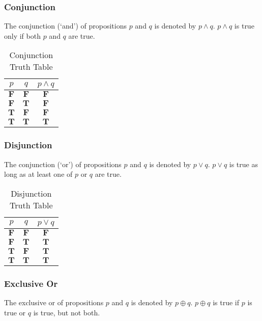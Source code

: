 \subsubsection{Conjunction}
The conjunction (`and') of propositions \(p\) and \(q\) is denoted by \(p \land q\). \(p \land q\) is true only if both \(p\) and \(q\) are true.

\begin{table}[htbp]
    \centering
    \begin{tabular}{ccc}
        \toprule
        \(p\)          & \(q\)          & \(p \land q\)  \\
        \midrule
        \(\mathbf{F}\) & \(\mathbf{F}\) & \(\mathbf{F}\) \\
        \(\mathbf{F}\) & \(\mathbf{T}\) & \(\mathbf{F}\) \\
        \(\mathbf{T}\) & \(\mathbf{F}\) & \(\mathbf{F}\) \\
        \(\mathbf{T}\) & \(\mathbf{T}\) & \(\mathbf{T}\) \\
        \bottomrule
    \end{tabular}
    \caption{Conjunction Truth Table}
\end{table}

\subsubsection{Disjunction}
The conjunction (`or') of propositions \(p\) and \(q\) is denoted by \(p \lor q\). \(p \lor q\) is true as long as at least one of \(p\) or \(q\) are true.

\begin{table}[htbp]
    \centering
    \begin{tabular}{ccc}
        \toprule
        \(p\)          & \(q\)          & \(p \lor q\)   \\
        \midrule
        \(\mathbf{F}\) & \(\mathbf{F}\) & \(\mathbf{F}\) \\
        \(\mathbf{F}\) & \(\mathbf{T}\) & \(\mathbf{T}\) \\
        \(\mathbf{T}\) & \(\mathbf{F}\) & \(\mathbf{T}\) \\
        \(\mathbf{T}\) & \(\mathbf{T}\) & \(\mathbf{T}\) \\
        \bottomrule
    \end{tabular}
    \caption{Disjunction Truth Table}
\end{table}

\subsubsection{Exclusive Or}
The exclusive or of propositions \(p\) and \(q\) is denoted by \(p \oplus q\). \(p \oplus q\) is true if \(p\) is true or \(q\) is true, but not both.

